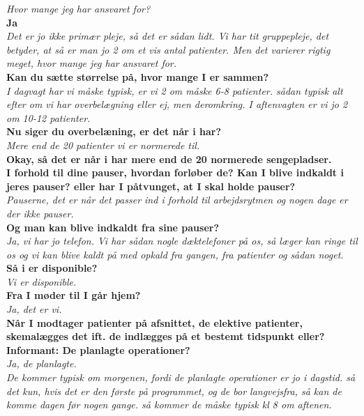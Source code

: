 \noindent
\textit{Hvor mange jeg har ansvaret for?} \\
\noindent
\textbf{Ja} \\
\noindent
\textit{Det er jo ikke primær pleje, så det er sådan lidt. Vi har tit gruppepleje, det betyder, at så er man jo 2 om et vis antal patienter. Men det varierer rigtig meget, hvor mange jeg har ansvaret for.} \\
\noindent
\textbf{Kan du sætte størrelse på, hvor mange I er sammen?} \\
\noindent
\textit{I dagvagt har vi måske typisk, er vi 2 om måske 6-8 patienter. sådan typisk alt efter om vi har overbelægning eller ej, men deromkring. I aftenvagten er vi jo 2 om 10-12 patienter.} \\
\noindent
\textbf{Nu siger du overbelæning, er det når i har?} \\
\noindent
\textit{Mere end de 20 patienter vi er normerede til.} \\
\noindent
\textbf{Okay, så det er når i har mere end de 20 normerede sengepladser. } \\
\noindent
\textbf{I forhold til dine pauser, hvordan forløber de? Kan I blive indkaldt i jeres pauser? eller har I påtvunget, at I skal holde pauser?} \\
\noindent
\textit{Pauserne, det er når det passer ind i forhold til arbejdsrytmen og nogen dage er der ikke pauser.} \\
\noindent
\textbf{Og man kan blive indkaldt fra sine pauser?} \\
\noindent
\textit{Ja, vi har jo telefon. Vi har sådan nogle dæktelefoner på os, så læger kan ringe til os og vi kan blive kaldt på med opkald fra gangen, fra patienter og sådan noget.}
\textbf{Så i er disponible?} \\
\noindent
\textit{Vi er disponible.} \\
\noindent
\textbf{Fra I møder til I går hjem?} \\
\noindent
\textit{Ja, det er vi.}  \\
\noindent
\textbf{Når I modtager patienter på afsnittet, de elektive patienter, skemalægges det ift. de indlægges på et bestemt tidspunkt eller?
Informant: De planlagte operationer?} \\
\noindent
\textit{Ja, de planlagte.} \\
\noindent
\textit{De kommer typisk om morgenen, fordi de planlagte operationer er jo i dagstid. så det kun, hvis det er den første på programmet, og de bor langvejsfra, så kan de komme dagen før nogen gange. så kommer de måske typisk kl 8 om aftenen.} \\
